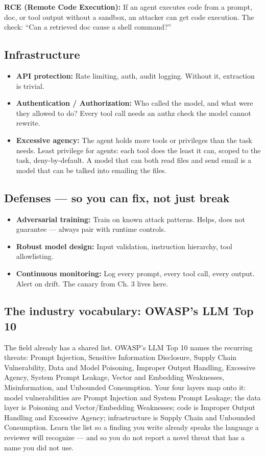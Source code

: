 \begin{defbox}
\textbf{RCE (Remote Code Execution):} If an agent executes code from a prompt, doc, or tool output without a sandbox, an attacker can get code execution. The check: ``Can a retrieved doc cause a shell command?''
\end{defbox}

\subsection{Infrastructure}
\begin{itemize}
\item \textbf{API protection:} Rate limiting, auth, audit logging. Without it, extraction is trivial.
\item \textbf{Authentication / Authorization:} Who called the model, and what were they allowed to do? Every tool call needs an authz check the model cannot rewrite.
\item \textbf{Excessive agency:} The agent holds more tools or privileges than the task needs. Least privilege for agents: each tool does the least it can, scoped to the task, deny-by-default. A model that can both read files and send email is a model that can be talked into emailing the files.
\end{itemize}

\subsection{Defenses — so you can fix, not just break}
\begin{itemize}
\item \textbf{Adversarial training:} Train on known attack patterns. Helps, does not guarantee — always pair with runtime controls.
\item \textbf{Robust model design:} Input validation, instruction hierarchy, tool allowlisting.
\item \textbf{Continuous monitoring:} Log every prompt, every tool call, every output. Alert on drift. The canary from Ch. 3 lives here.
\end{itemize}

\subsection{The industry vocabulary: OWASP's LLM Top 10}
The field already has a shared list. OWASP's LLM Top 10 names the recurring threats: Prompt Injection, Sensitive Information Disclosure, Supply Chain Vulnerability, Data and Model Poisoning, Improper Output Handling, Excessive Agency, System Prompt Leakage, Vector and Embedding Weaknesses, Misinformation, and Unbounded Consumption. Your four layers map onto it: model vulnerabilities are Prompt Injection and System Prompt Leakage; the data layer is Poisoning and Vector/Embedding Weaknesses; code is Improper Output Handling and Excessive Agency; infrastructure is Supply Chain and Unbounded Consumption. Learn the list so a finding you write already speaks the language a reviewer will recognize — and so you do not report a novel threat that has a name you did not use.

